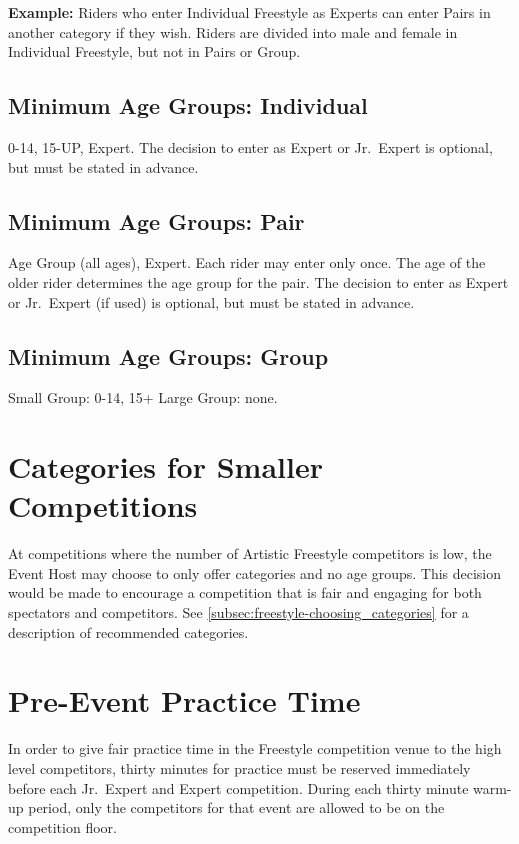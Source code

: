 \textbf{Example:} Riders who enter Individual Freestyle as Experts can enter Pairs in another category if they wish.
Riders are divided into male and female in Individual Freestyle, but not in Pairs or Group.

\subsection{Minimum Age Groups: Individual}
 0-14, 15-UP, Expert.
The decision to enter as Expert or Jr.~Expert is optional, but must be stated in advance.

\subsection{Minimum Age Groups: Pair}

Age Group (all ages), Expert.
Each rider may enter only once.
The age of the older rider determines the age group for the pair.
The decision to enter as Expert or Jr.~Expert (if used) is optional, but must be stated in advance.

\subsection{Minimum Age Groups: Group}

Small Group: 0-14, 15+
Large Group: none.

\section{Categories for Smaller Competitions}
At competitions where the number of Artistic Freestyle competitors is low, the Event Host may choose to only offer categories and no age groups.
This decision would be made to encourage a competition that is fair and engaging for both spectators and competitors.
See \ref{subsec:freestyle-choosing_categories} for a description of recommended categories.

\section{Pre-Event Practice Time}
In order to give fair practice time in the Freestyle competition venue to the high level competitors, thirty minutes for practice must be reserved immediately before each Jr.~Expert and Expert competition.
During each thirty minute warm-up period, only the competitors for that event are allowed to be on the competition floor.

